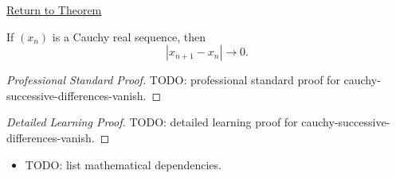 \newpage
{}
\label{prf:cauchy-successive-differences-vanish}

\begin{remark*}[Return]
\hyperref[thm:cauchy-successive-differences-vanish]{Return to Theorem}
\end{remark*}

\begin{theorem*}
If $(x_n)$ is a Cauchy real sequence, then
\[
  |x_{n+1}-x_n|\to 0.
\]

\smallskip
\noindent
\end{theorem*}

\begin{proof}[Professional Standard Proof]
\LRAProofBodyStart
TODO: professional standard proof for cauchy-successive-differences-vanish.
\end{proof}

\begin{proof}[Detailed Learning Proof]
\LRAProofBodyStart
TODO: detailed learning proof for cauchy-successive-differences-vanish.
\end{proof}

\begin{remark*}
\end{remark*}

\begin{dependencies}
\begin{itemize}
  \item TODO: list mathematical dependencies.
\end{itemize}
\end{dependencies}

\clearpage
